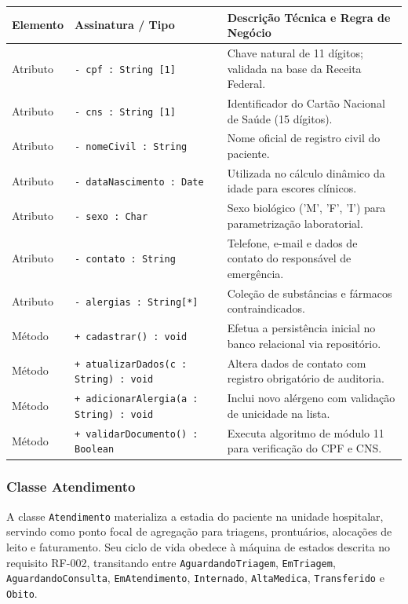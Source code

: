 \begingroup
\small
\noindent\begin{tabularx}{\linewidth}{l >{\raggedright\arraybackslash}p{5.7cm} >{\raggedright\arraybackslash}X}
\toprule
\textbf{Elemento} & \textbf{Assinatura / Tipo} & \textbf{Descrição Técnica e Regra de Negócio} \\
\midrule
Atributo & \texttt{- cpf : String [1]} & Chave natural de 11 dígitos; validada na base da Receita Federal. \\
Atributo & \texttt{- cns : String [1]} & Identificador do Cartão Nacional de Saúde (15 dígitos). \\
Atributo & \texttt{- nomeCivil : String} & Nome oficial de registro civil do paciente. \\
Atributo & \texttt{- dataNascimento : Date} & Utilizada no cálculo dinâmico da idade para escores clínicos. \\
Atributo & \texttt{- sexo : Char} & Sexo biológico ('M', 'F', 'I') para parametrização laboratorial. \\
Atributo & \texttt{- contato : String} & Telefone, e-mail e dados de contato do responsável de emergência. \\
Atributo & \texttt{- alergias : String[*]} & Coleção de substâncias e fármacos contraindicados. \\
\midrule
Método & \texttt{+ cadastrar() : void} & Efetua a persistência inicial no banco relacional via repositório. \\
Método & \texttt{+ atualizarDados(c : String) : void} & Altera dados de contato com registro obrigatório de auditoria. \\
Método & \texttt{+ adicionarAlergia(a : String) : void} & Inclui novo alérgeno com validação de unicidade na lista. \\
Método & \texttt{+ validarDocumento() : Boolean} & Executa algoritmo de módulo 11 para verificação do CPF e CNS. \\
\bottomrule
\end{tabularx}
\endgroup

\subsubsection{Classe Atendimento}
A classe \texttt{Atendimento} materializa a estadia do paciente na unidade hospitalar, servindo como ponto focal de agregação para triagens, prontuários, alocações de leito e faturamento. Seu ciclo de vida obedece à máquina de estados descrita no requisito RF-002, transitando entre \texttt{AguardandoTriagem}, \texttt{EmTriagem}, \texttt{AguardandoConsulta}, \texttt{EmAtendimento}, \texttt{Internado}, \texttt{AltaMedica}, \texttt{Transferido} e \texttt{Obito}.

